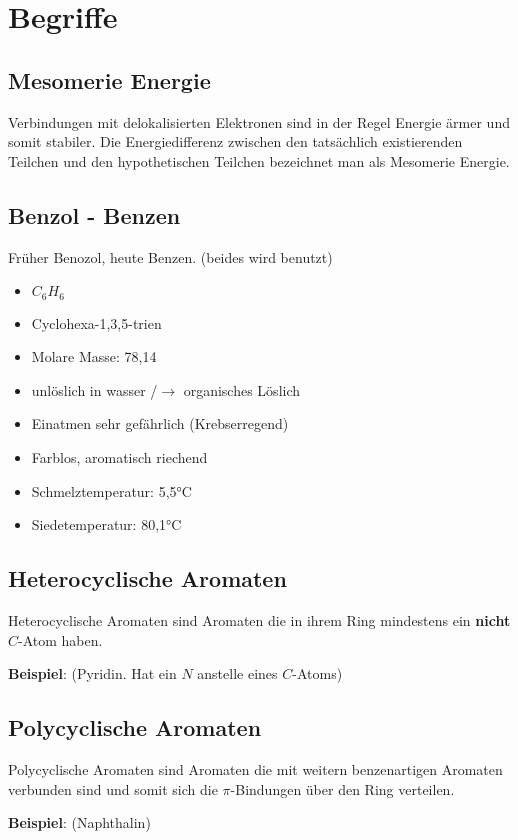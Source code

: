 \section{Begriffe}
\subsection{Mesomerie Energie} \label{sec:mesomerie}
Verbindungen mit delokalisierten Elektronen sind in der 
Regel Energie ärmer und somit stabiler. 
Die Energiedifferenz zwischen den tatsächlich existierenden 
Teilchen und den hypothetischen Teilchen bezeichnet man als 
Mesomerie Energie.

\subsection{Benzol - Benzen}
Früher Benozol, heute Benzen. (beides wird benutzt)
\begin{multicols}{2}
\begin{itemize}
    \item $C_6H_6$
    \item Cyclohexa-1,3,5-trien
    \item Molare Masse: 78,14
    \item unlöslich in wasser /$\rightarrow$ organisches Löslich
    \item Einatmen sehr gefährlich (Krebserregend)
    \item Farblos, aromatisch riechend
    \item Schmelztemperatur: 5,5°C
    \item Siedetemperatur: 80,1°C
\end{itemize}
\end{multicols}

\subsection{Heterocyclische Aromaten} 
\label{sec:heteroaromaten}
Heterocyclische Aromaten sind Aromaten die in ihrem Ring mindestens ein \textbf{nicht} $C$-Atom haben.

\textbf{Beispiel}: (Pyridin. Hat ein $N$ anstelle eines $C$-Atoms) 



\subsection{Polycyclische Aromaten} 
\label{sec:polyaromaten}
Polycyclische Aromaten sind Aromaten die mit weitern benzenartigen Aromaten verbunden sind und somit sich die $\pi$-Bindungen über den Ring verteilen.

\textbf{Beispiel}: (Naphthalin)

